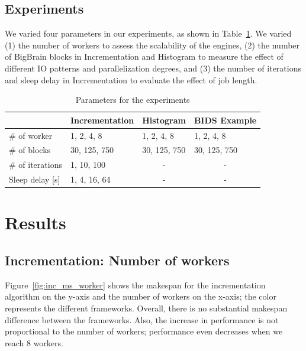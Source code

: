 \documentclass[conference]{IEEEtran}
\begin{document}
\subsection{Experiments}

We varied four parameters in our experiments, as shown in
Table~\ref{tab:param}. We varied (1) the number of workers to assess the
scalability of the engines, (2) the number of BigBrain blocks in
Incrementation and Histogram to measure the effect of different IO patterns
and parallelization degrees, and (3) the number of iterations and sleep
delay in Incrementation to evaluate the effect of job length.


\begin{table}[!t]
    \renewcommand{\arraystretch}{1.3}
    \caption{Parameters for the experiments}\label{tab:param}
    \centering
    \begin{tabular*}{\columnwidth}{llll}
    \hline
                        & Incrementation & Histogram             & BIDS Example          \\ \hline
    \# of worker        & 1, 2, 4, 8     & 1, 2, 4, 8            & 1, 2, 4, 8            \\
    \# of blocks        & 30, 125, 750   & 30, 125, 750          & 30, 125, 750          \\
    \# of iterations    & 1, 10, 100     & \multicolumn{1}{c}{-} & \multicolumn{1}{c}{-} \\
    Sleep delay {[}s{]} & 1, 4, 16, 64   & \multicolumn{1}{c}{-} & \multicolumn{1}{c}{-} \\ \hline
    \end{tabular*}
    \end{table}






\section{Results}

\subsection{Incrementation: Number of workers}
Figure~\ref{fig:inc_ms_worker} shows the makespan for the incrementation algorithm on
the y-axis and the number of workers on the x-axis; the color represents the
different frameworks. Overall, there is no substantial makespan difference between
the frameworks. Also, the increase in performance is not proportional to the number
of workers; performance even decreases when we reach 8 workers.
\end{document}
